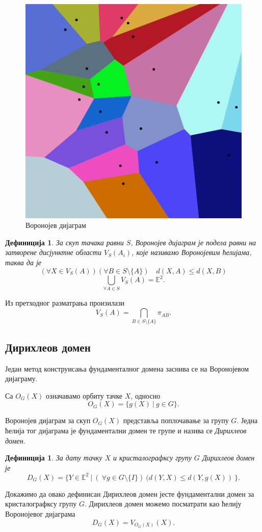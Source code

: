 \documentclass[12pt]{article}
\newtheorem{definition}[theorem]{\bf Дефиниција}
\begin{document}
\begin{figure}[H]
    \centering
    \includegraphics[width=.3\textwidth]{voronoiiii.png}
    \caption{Воронојев дијаграм}
    \label{fig:vor}
\end{figure}

\begin{definition}%
За скуп тачака равни $S$, Воронојев дијаграм је подела равни на затворене дисјунктне области $V_S(A_i)$, које називамо Воронојевим  ћелијама, таква да је
$$ (\forall X \in V_{S}(A))(\forall B \in S\setminus \{A\})\quad d(X,A)\leq d(X,B) $$
$$ \bigcup_{\forall A \in S} V_{S}(A) = \mathbb{E}^2 .$$

\end{definition}

Из претходног разматрања произилази
$$V_S(A) = \bigcap _{B \in S \setminus \{A\}} \pi_{AB}.$$ 

\subsection{Дирихлеов домен}

Један метод конструисања фундаменталног домена заснива се на Воронојевом дијаграму. 

Са $O_G(X)$ означавамо орбиту тачке $X$, односно
$$O_G(X) = \{g(X)\:|\:g \in G\} .$$

Воронојев дијаграм за скуп $O_G(X)$ представља поплочавање за групу $G$. Једна ћелија тог дијаграма је фундаментални домен те групе и назива се \emph{Дирихлеов домен}.


\begin{definition}
За дату тачку $X$ и кристалографксу групу $G$ Дирихлеов домен је
$$D_G(X) = \{Y \in \mathbb{E}^2\:|\:(\:\forall g \in G \setminus \{I\})\:(d(Y,X)\leq d(Y,g(X))\:\}.$$
\end{definition}

\noindent  Докажимо да овако дефинисан Дирихлеов домен јесте фундаментални домен за кристалографксу групу $G$.
Дирихлеов домен можемо посматрати као ћелију Воронојевог дијаграма 
$$D_G(X)= V_{O_G(X)}(X).$$
\end{document}
